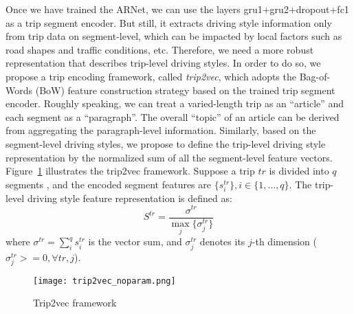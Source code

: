 \documentclass{article}
\begin{document}
Once we have trained the ARNet, we can use the layers gru1+gru2+dropout+fc1 as a trip segment encoder. %
But still, it extracts driving style information only from trip data on segment-level, which can be impacted by local factors such as road shapes and traffic conditions, etc.
Therefore, we need a more robust representation that describes trip-level driving styles.
In order to do so, we propose a trip encoding framework, called \emph{trip2vec}, which adopts the Bag-of-Words (BoW) feature construction strategy \cite{fei2005bayesian} based on the trained trip segment encoder.
Roughly speaking, we can treat a varied-length trip as an ``article'' and each segment as a ``paragraph''.
The overall ``topic'' of an article can be derived from aggregating the paragraph-level information.
Similarly, based on the segment-level driving styles, we propose to define the trip-level driving style representation by the normalized sum of all the segment-level feature vectors.
Figure~\ref{fig:trip2vec} illustrates the trip2vec framework.
Suppose a trip $tr$ is divided into $q$ segments%
, and the encoded segment features are %
$\{s^{tr}_i\}, i\in\{1,\ldots,q\}$.
The trip-level driving style feature representation is defined as:
\begin{equation}\label{eq:trip_encoding}
S^{tr} = \frac{\sigma^{tr}}{\max_j \{\sigma_{j}^{tr}\}}
\end{equation}
where $\sigma^{tr}=\sum_i^q s^{tr}_i$ is the vector sum, and $\sigma_j^{tr}$ denotes its $j$-th dimension ($\sigma_{j}^{tr}>=0, \forall tr, j$).


\begin{figure}[tb]
\centering
\texttt{[image: trip2vec\_noparam.png]}
\vspace{-0.15in}
\caption{Trip2vec framework}
\label{fig:trip2vec}
\vspace{-0.1in}
\end{figure}
\end{document}
